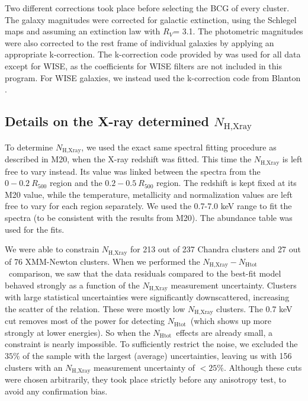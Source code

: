 \documentclass{aa}   %
\newcommand{\nhtot}{$N_{\text{Htot}}$}
\begin{document}
Two different corrections took place before selecting the BCG of every cluster. The galaxy magnitudes were corrected for galactic extinction, using the Schlegel maps \citep{schlegel1998maps} and assuming an extinction law \citep{fitzpatrick1999correcting} with $R_V$= 3.1. The photometric magnitudes were also corrected to the rest frame of individual galaxies by applying an appropriate k-correction. The k-correction code provided by \citet{chilingarian2011universal} was used for all data except for WISE, as the coefficients for WISE filters are not included in this program. For WISE galaxies, we instead used the k-correction code from Blanton \citep{blanton2007k}. 

\subsection{Details on the X-ray determined $N_{\text{H,Xray}}$}\label{details_xray_nh}

To determine $N_{\text{H,Xray}}$, we used the exact same spectral fitting procedure as described in M20, when the X-ray redshift was fitted. This time the $N_{\text{H,Xray}}$ is left free to vary instead. Its value was linked between the spectra from the $0-0.2\ R_{500}$ region and the $0.2-0.5\ R_{500}$ region. The redshift is kept fixed at its M20 value, while the temperature, metallicity and normalization values are left free to vary for each region separately. We used the 0.7-7.0 keV range to fit the spectra (to be consistent with the results from M20). The \citet{aspl} abundance table was used for the fits.

We were able to constrain $N_{\text{H,Xray}}$ for 213 out of 237 Chandra clusters and 27 out of 76 XMM-Newton clusters. When we performed the $N_{\text{H,Xray}}-$\nhtot\ comparison, we saw that the data residuals compared to the best-fit model behaved strongly as a function of the $N_{\text{H,Xray}}$ measurement uncertainty. Clusters with large statistical uncertainties were significantly downscattered, increasing the scatter of the relation. These were mostly low $N_{\text{H,Xray}}$ clusters. The 0.7 keV cut removes most of the power for detecting \nhtot\ (which shows up more strongly at lower energies). So when the \nhtot\ effects are already small, a constraint is nearly impossible. To sufficiently restrict the noise, we excluded the $35\%$ of the sample with the largest (average) uncertainties, leaving us with 156 clusters with an $N_{\text{H,Xray}}$ measurement uncertainty of $<25\%$. Although these cuts were chosen arbitrarily, they took place strictly before any anisotropy test, to avoid any confirmation bias.
\end{document}

